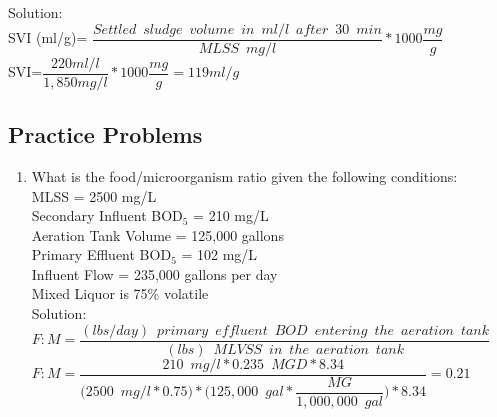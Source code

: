 \documentclass{article}
\begin{document}
\begin{enumerate}
\vspace{0.5cm}
Solution:\\
SVI (ml/g)= $\dfrac{Settled \enspace sludge \enspace volume \enspace in \enspace ml/l \enspace after \enspace 30 \enspace min}{MLSS \enspace mg/l}*1000 \dfrac{mg}{g}$\\
\vspace{0.5cm}
SVI=$\dfrac{220ml/l}{1,850mg/l}*1000\dfrac{mg}{g}=\boxed{119ml/g}$


\end{enumerate}

\subsection{Practice Problems} 

\begin{enumerate}

\item What is the food/microorganism ratio given the following conditions:\\
MLSS = 2500 mg/L\\
Secondary Influent BOD$_5$ = 210 mg/L\\
Aeration Tank Volume = 125,000 gallons\\
Primary Effluent BOD$_5$ = 102 mg/L\\
Influent Flow = 235,000 gallons per day\\
Mixed Liquor is 75\% volatile\\

Solution:\\
\vspace{0.3cm}
$F:M=\dfrac{(lbs/day) \enspace primary \enspace effluent  \enspace BOD \enspace entering \enspace the  \enspace aeration \enspace tank}{(lbs) \enspace MLVSS \enspace in \enspace the  \enspace aeration \enspace tank}$\\
\vspace{0.3cm}
$F:M=\dfrac{210 \enspace mg/l*0.235 \enspace MGD*8.34}{\big(2500 \enspace mg/l*0.75\big)*\bigg(125,000 \enspace gal*\dfrac{MG}{1,000,000 \enspace gal}\bigg)*8.34}=\boxed{0.21}$\\


\end{enumerate}
\end{document}
